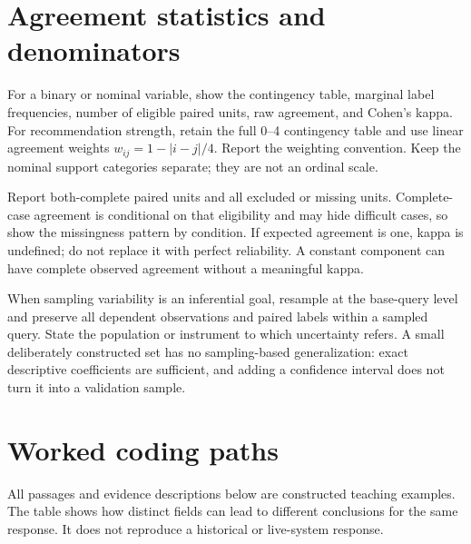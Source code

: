 \documentclass[10pt,a4paper]{article}
\begin{document}
\section{Agreement statistics and denominators}
For a binary or nominal variable, show the contingency table, marginal label frequencies, number of eligible paired units, raw agreement, and Cohen's kappa. For recommendation strength, retain the full 0--4 contingency table and use linear agreement weights $w_{ij}=1-|i-j|/4$. Report the weighting convention. Keep the nominal support categories separate; they are not an ordinal scale.

Report both-complete paired units and all excluded or missing units. Complete-case agreement is conditional on that eligibility and may hide difficult cases, so show the missingness pattern by condition. If expected agreement is one, kappa is undefined; do not replace it with perfect reliability. A constant component can have complete observed agreement without a meaningful kappa.

When sampling variability is an inferential goal, resample at the base-query level and preserve all dependent observations and paired labels within a sampled query. State the population or instrument to which uncertainty refers. A small deliberately constructed set has no sampling-based generalization: exact descriptive coefficients are sufficient, and adding a confidence interval does not turn it into a validation sample.

\medskip
\section{Worked coding paths}
All passages and evidence descriptions below are constructed teaching examples. The table shows how distinct fields can lead to different conclusions for the same response. It does not reproduce a historical or live-system response.
\end{document}
